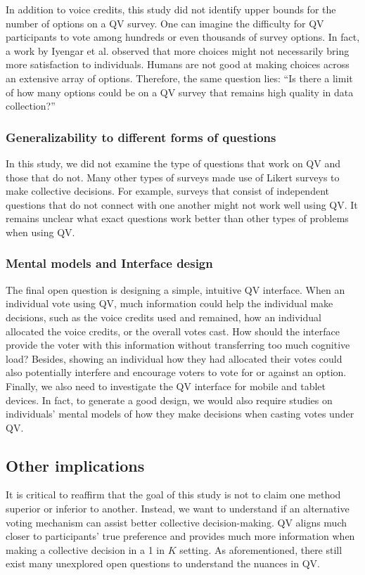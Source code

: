 In addition to voice credits, this study did not identify upper bounds for the number of options on a QV survey. One can imagine the difficulty for QV participants to vote among hundreds or even thousands of survey options. In fact, a work by Iyengar et al. \cite{iyengar2000choice} observed that more choices might not necessarily bring more satisfaction to individuals. Humans are not good at making choices across an extensive array of options. Therefore, the same question lies: ``Is there a limit of how many options could be on a QV survey that remains high quality in data collection?''

\subsubsection{Generalizability to different forms of questions}
In this study, we did not examine the type of questions that work on QV and those that do not. Many other types of surveys made use of Likert surveys to make collective decisions. For example, surveys that consist of independent questions that do not connect with one another might not work well using QV. It remains unclear what exact questions work better than other types of problems when using QV.

\subsubsection{Mental models and Interface design}
The final open question is designing a simple, intuitive QV interface. When an individual vote using QV, much information could help the individual make decisions, such as the voice credits used and remained, how an individual allocated the voice credits, or the overall votes cast. How should the interface provide the voter with this information without transferring too much cognitive load? Besides, showing an individual how they had allocated their votes could also potentially interfere and encourage voters to vote for or against an option. Finally, we also need to investigate the QV interface for mobile and tablet devices. In fact, to generate a good design, we would also require studies on individuals' mental models of how they make decisions when casting votes under QV.

\subsection{Other implications}
It is critical to reaffirm that the goal of this study is not to claim one method superior or inferior to another. Instead, we want to understand if an alternative voting mechanism can assist better collective decision-making. QV aligns much closer to participants' true preference and provides much more information when making a collective decision in a 1 in $K$ setting. As aforementioned, there still exist many unexplored open questions to understand the nuances in QV.






